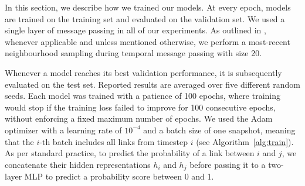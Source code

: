  In this section, we describe how we trained our models. At every epoch, models are trained on the training set and evaluated on the validation set. We used a single layer of message passing in all of our experiments. As outlined in , whenever applicable and unless mentioned otherwise, we perform a most-recent neighbourhood sampling during temporal message passing with size 20. 

Whenever a model reaches its best validation performance, it is subsequently evaluated on the test set. Reported results are averaged over five different random seeds. Each model was trained with a patience of 100 epochs, where training would stop if the training loss failed to improve for 100 consecutive epochs, without enforcing a fixed maximum number of epochs. We used the Adam optimizer with a learning rate of $10^{-4}$ and a batch size of one snapshot, meaning that the $i$-th batch includes all links from timestep $i$ (see Algorithm~\ref{alg:train}). As per standard practice, to predict the probability of a link between $i$ and $j$, we concatenate their hidden representations $h_i$ and $h_j$ before passing it to a two-layer MLP to predict a probability score between 0 and 1. 
